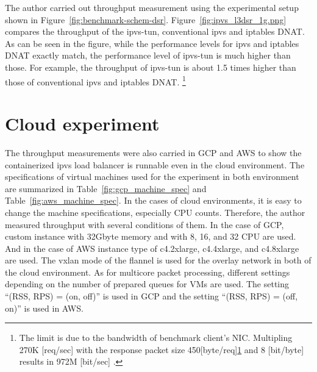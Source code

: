The author carried out throughput measurement using the experimental setup shown in Figure~\ref{fig:benchmark-schem-dsr}.
Figure~\ref{fig:ipvs_l3dsr_1g.png} compares the throughput of the ipvs-tun, conventional ipvs and iptables DNAT.
As can be seen in the figure, while the performance levels for ipvs and iptables DNAT exactly match, the performance level of ipvs-tun is much higher than those.
For example, the throughput of ipvs-tun is about 1.5 times higher than those of conventional ipvs and iptables DNAT.
\footnote{The limit is due to the bandwidth of benchmark client's NIC.
Multipling 270K [req/sec] with the response packet size 450[byte/req]\ref{} and 8 [bit/byte] results in 972M [bit/sec] . }



\FloatBarrier

\section{Cloud experiment}

The throughput measurements were also carried in GCP and AWS to show the containerized ipvs load balancer is runnable even in the cloud environment.
The specifications of virtual machines used for the experiment in both environment are summarized in Table~\ref{fig:gcp_machine_spec} and Table~\ref{fig:aws_machine_spec}.
In the cases of cloud environments, it is easy to change the machine specifications, especially CPU counts.
Therefore, the author measured throughput with several conditions of them.
In the case of GCP, custom instance with 32Gbyte memory and with 8, 16, and 32 CPU are used.
And in the case of AWS instance type of c4.2xlarge, c4.4xlarge, and c4.8xlarge are used.
The vxlan mode of the flannel is used for the overlay network in both of the cloud environment.
As for multicore packet processing, different settings depending on the number of prepared queues for VMs are used. 
The setting \enquote{(RSS, RPS) = (on, off)} is used in GCP and the setting \enquote{(RSS, RPS) = (off, on)} is used in AWS.


